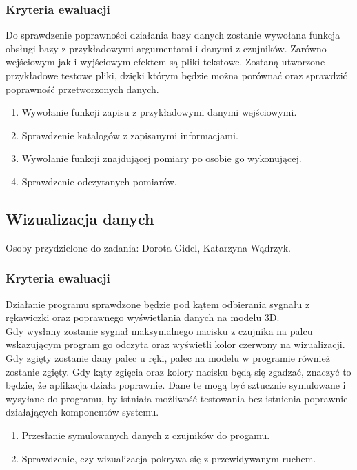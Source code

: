 \documentclass{article}
\begin{document}
\subsubsection{Kryteria ewaluacji}
Do sprawdzenie poprawności działania bazy danych zostanie wywołana funkcja obsługi bazy z przykładowymi argumentami i danymi z czujników. Zarówno wejściowym jak i wyjściowym efektem są pliki tekstowe. Zostaną utworzone przykładowe testowe pliki, dzięki którym będzie można porównać oraz sprawdzić poprawność przetworzonych danych.

\begin{enumerate}
	\item Wywołanie funkcji zapisu z przykładowymi danymi wejściowymi.
	\item Sprawdzenie katalogów z zapisanymi informacjami.
	\item Wywołanie funkcji znajdującej pomiary po osobie go wykonującej.
	\item Sprawdzenie odczytanych pomiarów.
\end{enumerate}


\subsection{Wizualizacja danych}
Osoby przydzielone do zadania: Dorota Gidel, Katarzyna Wądrzyk.
\subsubsection{Kryteria ewaluacji}
Działanie programu sprawdzone będzie pod kątem odbierania sygnału z rękawiczki oraz poprawnego wyświetlania danych na modelu 3D. \\
Gdy wysłany zostanie sygnał maksymalnego nacisku z czujnika na palcu wskazującym program go odczyta oraz wyświetli kolor czerwony na wizualizacji. Gdy zgięty zostanie dany palec u ręki, palec na modelu w programie również zostanie zgięty. Gdy kąty zgięcia oraz kolory nacisku będą się zgadzać, znaczyć to będzie, że aplikacja działa poprawnie. Dane te mogą być sztucznie symulowane i wysyłane do programu, by istniała możliwość testowania bez istnienia poprawnie działających komponentów systemu.

\begin{enumerate}
	\item Przesłanie  symulowanych danych z czujników do progamu.
	\item Sprawdzenie, czy wizualizacja pokrywa się z przewidywanym ruchem.
\end{enumerate}
\end{document}
